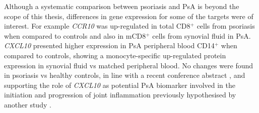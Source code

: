 


Although a systematic comparison between psoriasis and PsA is beyond the scope of this thesis, differences in gene expression for some of the targets were of interest. %
For example \textit{CCR10} was up-regulated  in total CD8$^+$ cells from psoriasis when compared to controls and also in mCD8$^+$ cells from synovial fluid in PsA. \textit{CXCL10} presented higher expression in PsA peripheral blood CD14$^+$ when compared to controls, showing a monocyte-specific up-regulated protein expression in synovial fluid vs matched peripheral blood. No changes were found in psoriasis vs healthy controls, in line with a recent conference abstract \parencite{Muntyanu2017}, and supporting the role of \textit{CXCL10} as potential PsA biomarker involved in the initiation and progression of joint inflammation previously hypothesised by another study \parencite{Abji2016}.




